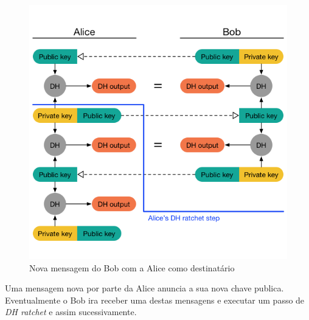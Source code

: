 \begin{figure}[H]
\begin{center}
\includegraphics[width=12cm]{img/DH3.png}
\caption{Nova mensagem do Bob com a Alice como destinatário}
\label{diagram:DH3}
\centering
\end{center}
\end{figure}

Uma mensagem nova por parte da Alice anuncia a sua nova chave publica. Eventualmente o Bob ira receber uma destas mensagens e executar um passo de \textit{DH ratchet} e assim sucessivamente.

